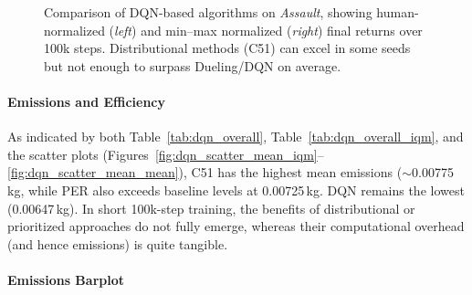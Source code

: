 \begin{figure}
	\centering
	\quad
	\caption{Comparison of DQN-based algorithms on \textit{Assault}, 
		showing human-normalized (\textit{left}) and min--max normalized (\textit{right}) 
		final returns over 100k steps. 
		Distributional methods (C51) can excel in some seeds but not enough to surpass Dueling/DQN on average.}
	\label{fig:assault_comparison}
\end{figure}

\paragraph{Emissions and Efficiency}
As indicated by both Table~\ref{tab:dqn_overall}, Table~\ref{tab:dqn_overall_iqm}, 
and the scatter plots (Figures~\ref{fig:dqn_scatter_mean_iqm}--\ref{fig:dqn_scatter_mean_mean}), 
C51 has the highest mean emissions ($\sim$\num{0.00775}\,kg, 
while PER also exceeds baseline levels at \num{0.00725}\,kg. 
DQN remains the lowest (\num{0.00647}\,kg). 
In short 100k-step training, the benefits of distributional or prioritized approaches 
do not fully emerge, whereas their computational overhead (and hence emissions) is quite tangible.

\paragraph{Emissions Barplot}

